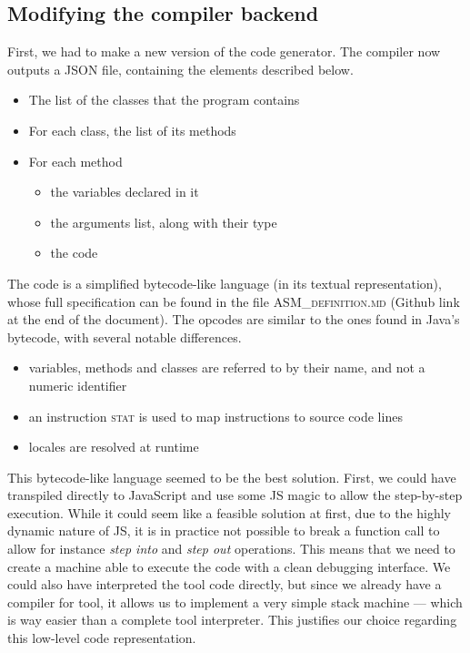 \subsection{Modifying the compiler backend}
\label{backend}

First, we had to make a new version of the code generator. The compiler now outputs a JSON file, containing the elements described below.

\begin{itemize}
\item The list of the classes that the program contains
\item For each class, the list of its methods
\item For each method
	\begin{itemize}
	\item the variables declared in it
	\item the arguments list, along with their type
	\item the code
	\end{itemize}
\end{itemize}

The code is a simplified bytecode-like language (in its textual representation), whose full specification can be found in the file \textsc{ASM\_definition.md} (Github link at the end of the document). The opcodes are similar to the ones found in Java's bytecode, with several notable differences.

\begin{itemize}
\item variables, methods and classes are referred to by their name, and not a numeric identifier
\item an instruction \textsc{stat} is used to map instructions to source code lines
\item locales are resolved at runtime
\end{itemize}

This bytecode-like language seemed to be the best solution. First, we could have transpiled directly to JavaScript and use some JS magic to allow the step-by-step execution. While it could seem like a feasible solution at first, due to the highly dynamic nature of JS, it is in practice not possible to break a function call to allow for instance \textit{step into} and \textit{step out} operations. This means that we need to create a machine able to execute the code with a clean debugging interface. We could also have interpreted the tool code directly, but since we already have a compiler for tool, it allows us to implement a very simple stack machine --- which is way easier than a complete tool interpreter. This justifies our choice regarding this low-level code representation.

